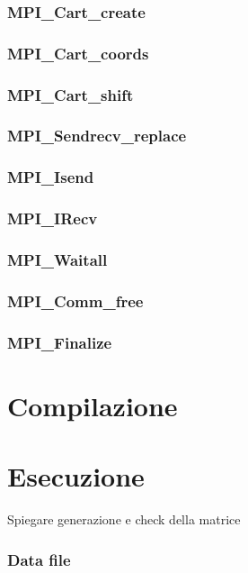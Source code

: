 \subsubsection{MPI\_Cart\_create}

\subsubsection{MPI\_Cart\_coords}

\subsubsection{MPI\_Cart\_shift}

\subsubsection{MPI\_Sendrecv\_replace}

\subsubsection{MPI\_Isend}

\subsubsection{MPI\_IRecv}

\subsubsection{MPI\_Waitall}

\subsubsection{MPI\_Comm\_free}

\subsubsection{MPI\_Finalize}

\section{Compilazione}

\section{Esecuzione}
Spiegare generazione e check della matrice

\subsubsection{Data file}

